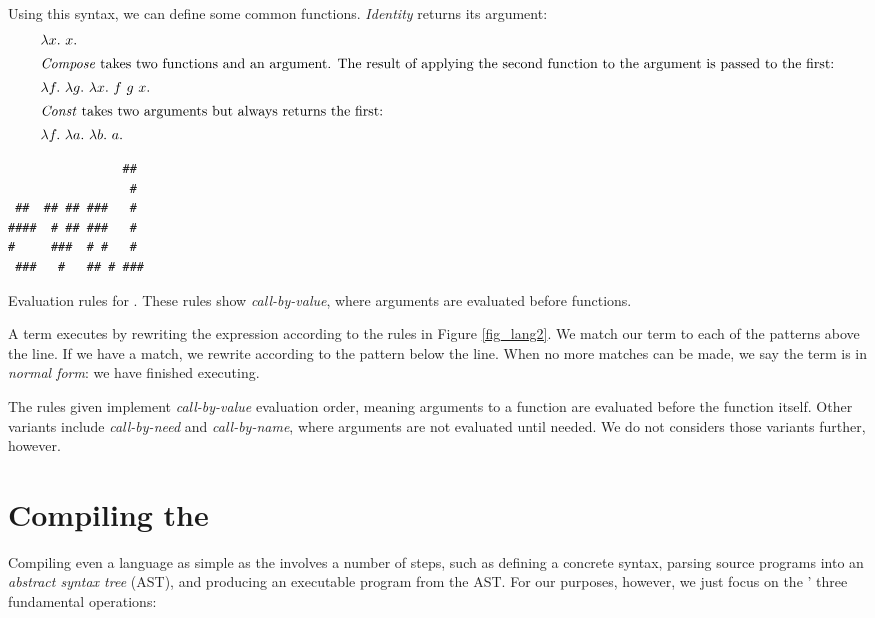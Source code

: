 \documentclass[12pt]{report}
\begin{document}
Using this syntax, we can define some common functions. \emph{Identity} 
returns its argument:
\begin{align}
  & \lambda x.\ x. \\
\intertext{\emph{Compose} takes two functions and an argument. The result of
applying the second function to the argument is passed to the first:}
  & \lambda f.\ \lambda g.\ \lambda x.\ f\ g\ x. \\
\intertext{\emph{Const} takes two arguments but always returns the first:}
  & \lambda f.\ \lambda a.\ \lambda b.\ a.
\end{align}

\begin{myfig}[bt]
\begin{minipage}{2in}
\begin{Verbatim}
                ##  
                 #  
 ##  ## ## ###   #  
####  # ## ###   #  
#     ###  # #   #  
 ###   #   ## # ### 
\end{Verbatim}
\end{minipage}
  \caption{Evaluation rules for \lamA. These rules show 
    \emph{call-by-value}, where arguments are evaluated
    before functions.}
  \label{fig_lang2}
\end{myfig}

A \lamA term executes by rewriting the expression according to the
rules in Figure \ref{fig_lang2}. We match our term to each of the
patterns above the line. If we have a match, we rewrite according to
the pattern below the line. When no more matches can be made, we say
the term is in \emph{normal form}: we have finished executing.

The rules given implement \emph{call-by-value} evaluation order,
meaning arguments to a function are evaluated before the function
itself. Other variants include \emph{call-by-need} and
\emph{call-by-name}, where arguments are not evaluated until
needed. We do not considers those variants further, however.

\section{Compiling the \LamA}
\label{sec_lang1}

Compiling even a language as simple as the \lamA involves a number of
steps, such as defining a concrete syntax, parsing source programs
into an \emph{abstract syntax tree} (AST), and producing an executable
program from the AST. For our purposes, however, we just focus on the
\lamA' three fundamental operations:
\end{document}
